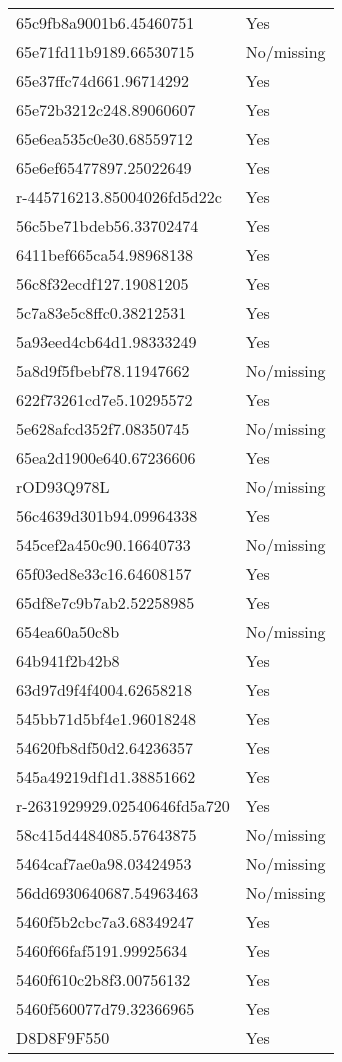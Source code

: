 \begin{tabular}{ll}
65c9fb8a9001b6.45460751 & Yes \\
65e71fd11b9189.66530715 & No/missing \\
65e37ffc74d661.96714292 & Yes \\
65e72b3212c248.89060607 & Yes \\
65e6ea535c0e30.68559712 & Yes \\
65e6ef65477897.25022649 & Yes \\
r-445716213.85004026fd5d22c & Yes \\
56c5be71bdeb56.33702474 & Yes \\
6411bef665ca54.98968138 & Yes \\
56c8f32ecdf127.19081205 & Yes \\
5c7a83e5c8ffc0.38212531 & Yes \\
5a93eed4cb64d1.98333249 & Yes \\
5a8d9f5fbebf78.11947662 & No/missing \\
622f73261cd7e5.10295572 & Yes \\
5e628afcd352f7.08350745 & No/missing \\
65ea2d1900e640.67236606 & Yes \\
rOD93Q978L & No/missing \\
56c4639d301b94.09964338 & Yes \\
545cef2a450c90.16640733 & No/missing \\
65f03ed8e33c16.64608157 & Yes \\
65df8e7c9b7ab2.52258985 & Yes \\
654ea60a50c8b & No/missing \\
64b941f2b42b8 & Yes \\
63d97d9f4f4004.62658218 & Yes \\
545bb71d5bf4e1.96018248 & Yes \\
54620fb8df50d2.64236357 & Yes \\
545a49219df1d1.38851662 & Yes \\
r-2631929929.02540646fd5a720 & Yes \\
58c415d4484085.57643875 & No/missing \\
5464caf7ae0a98.03424953 & No/missing \\
56dd6930640687.54963463 & No/missing \\
5460f5b2cbc7a3.68349247 & Yes \\
5460f66faf5191.99925634 & Yes \\
5460f610c2b8f3.00756132 & Yes \\
5460f560077d79.32366965 & Yes \\
D8D8F9F550 & Yes \\

\end{tabular}
